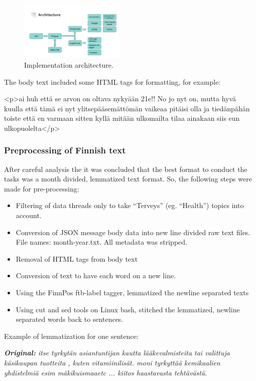 \documentclass[conference]{IEEEtran}
\begin{document}
\begin{figure}[htbp]
    \centerline{\includegraphics[width=0.45\textwidth]{figures/fig3.jpg}}
    \caption{Implementation architecture.}
    \label{implementation_architecture}
\end{figure}

The body text included some HTML tags for formatting, for example:

\textless p\textgreater ai huh että se arvon on oltava nykyään 21e!! No jo nyt on, mutta hyvä kuulla että tämä ei nyt ylitsepääsemättömän vaikeaa pitäisi olla ja tiedänpähän toiste että en varmaan sitten kyllä mitään ulkomailta tilaa ainakaan siis eun ulkopuolelta\textless /p\textgreater

\subsubsection{Preprocessing of Finnish text}
After careful analysis the it was concluded that the best format to conduct the tasks was a month divided, lemmatized text format. So, the following steps were made for pre-processing:

\begin{itemize}
    \item Filtering of data threads only to take “Terveys” (eg. “Health”) topics into account.
    \item Conversion of JSON message body data into new line divided raw text files. File names: month-year.txt. All metadata was stripped.
    \item Removal of HTML tags from body text
    \item Conversion of text to have each word on a new line.
    \item Using the FinnPos ftb-label tagger, lemmatized the newline separated texts
    \item Using cut and sed tools on Linux bash, stitched the lemmatized, newline separated words back to sentences.
\end{itemize}

Example of lemmatization for one sentence:

\textit{\textbf{Original:} itse tyrkytän asiantuntijan kautta lääkevalmisteita tai valittuja käsikaupan tuotteita , kuten vitamiinilisät. moni tyrkyttää kemikaalien yhdistelmiä esim mäkikuismaaetc ... kiitos haastavasta tehtävästä.}
\end{document}
